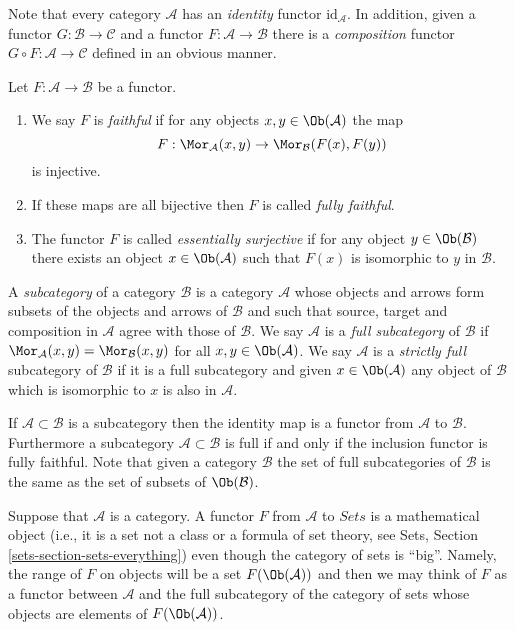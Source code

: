 \noindent
Note that every category $\mathcal{A}$ has an
{\it identity} functor $\text{id}_\mathcal{A}$.
In addition, given a functor $G : \mathcal{B} \to \mathcal{C}$
and a functor $F : \mathcal{A} \to \mathcal{B}$ there is
a {\it composition} functor $G \circ F : \mathcal{A} \to \mathcal{C}$
defined in an obvious manner.

\begin{definition}
\label{definition-faithful}
Let $F : \mathcal{A} \to \mathcal{B}$ be a functor.
\begin{enumerate}
\item We say $F$ is {\it faithful} if
for any objects $x, y \in \Ob(\mathcal{A})$ the map
$$
F : \Mor_\mathcal{A}(x, y) \to \Mor_\mathcal{B}(F(x), F(y))
$$
is injective.
\item If these maps are all bijective then $F$ is called
{\it fully faithful}.
\item
The functor $F$ is called {\it essentially surjective} if for any
object $y \in \Ob(\mathcal{B})$ there exists an object
$x \in \Ob(\mathcal{A})$ such that $F(x)$ is isomorphic to $y$ in
$\mathcal{B}$.
\end{enumerate}
\end{definition}

\begin{definition}
\label{definition-subcategory}
A {\it subcategory} of a category $\mathcal{B}$ is
a category $\mathcal{A}$ whose objects and arrows
form subsets of the objects and arrows
of $\mathcal{B}$ and such that source, target
and composition in $\mathcal{A}$ agree with those
of $\mathcal{B}$. We say $\mathcal{A}$ is a
{\it full subcategory} of $\mathcal{B}$ if $\Mor_\mathcal{A}(x, y)
= \Mor_\mathcal{B}(x, y)$ for all $x, y \in \Ob(\mathcal{A})$.
We say $\mathcal{A}$ is a {\it strictly full} subcategory of $\mathcal{B}$
if it is a full subcategory and given $x \in \Ob(\mathcal{A})$ any
object of $\mathcal{B}$ which is isomorphic to $x$ is also in $\mathcal{A}$.
\end{definition}

\noindent
If $\mathcal{A} \subset \mathcal{B}$ is a subcategory then the
identity map is a functor from $\mathcal{A}$ to $\mathcal{B}$.
Furthermore a subcategory $\mathcal{A} \subset \mathcal{B}$
is full if and only if the inclusion functor is fully faithful.
Note that given a category $\mathcal{B}$ the set of full subcategories
of $\mathcal{B}$ is the same as the set of subsets of
$\Ob(\mathcal{B})$.

\begin{remark}
\label{remark-functor-into-sets}
Suppose that $\mathcal{A}$ is a category.
A functor $F$ from $\mathcal{A}$ to $\textit{Sets}$
is a mathematical object (i.e., it is a set not a class or a formula
of set theory, see
Sets, Section \ref{sets-section-sets-everything})
even though the category of sets is ``big''.
Namely, the range of $F$ on objects will be
a set $F(\Ob(\mathcal{A}))$ and then we
may think of $F$ as a functor between
$\mathcal{A}$ and the full subcategory
of the category of sets whose
objects are elements of $F(\Ob(\mathcal{A}))$.
\end{remark}

